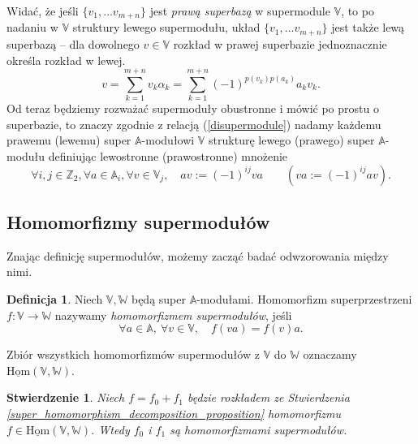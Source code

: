 \documentclass[11pt,a4paper]{report}
\newtheorem{proposition}[theorem]{Stwierdzenie}
\theoremstyle{definition}
\newtheorem{definition}[theorem]{Definicja}
\begin{document}
Widać, że jeśli $\{ v_1, \ldots v_{m+n} \}$ jest \textit{prawą superbazą} w supermodule $\mathbb{V}$, to po nadaniu w $\mathbb{V}$ struktury lewego supermodułu, układ $\{ v_1, \ldots v_{m+n} \}$ jest także lewą superbazą -- dla dowolnego $v\in \mathbb{V}$ rozkład w prawej superbazie jednoznacznie określa rozkład w lewej.
\begin{equation*}
v = \sum_{k=1}^{m+n} v_k \alpha_k = \sum_{k=1}^{m+n} (-1)^{p(v_k)p(a_k)} a_k v_k.
\end{equation*}
Od teraz będziemy rozważać supermoduły obustronne i mówić po prostu o superbazie, to znaczy zgodnie z relacją (\ref{disupermodule}) nadamy każdemu prawemu (lewemu) super $\mathbb{A}$-modułowi $\mathbb{V}$ strukturę lewego (prawego) super $\mathbb{A}$-modułu definiując lewostronne (prawostronne) mnożenie
\begin{equation*}
 \forall i,j \in \mathbb{Z}_2, \forall a \in \mathbb{A}_i, \forall v \in \mathbb{V}_j, \quad av := (-1)^{ij}va \qquad \left( va := (-1)^{ij}av \right).
\end{equation*}

\subsection{Homomorfizmy supermodułów}

Znając definicję supermodułów, możemy zacząć badać odwzorowania między nimi.

\begin{definition}
\label{superlinear_morphism}
Niech $\mathbb{V}, \mathbb{W}$ będą super $\mathbb{A}$-modułami. Homomorfizm superprzestrzeni $f: \mathbb{V} \rightarrow \mathbb{W}$ nazywamy \textit{homomorfizmem supermodułów}, jeśli 
\begin{equation}
\label{superlinear_morphism_property}
\forall a \in \mathbb{A},\ \forall v \in \mathbb{V}, \quad f(va) = f(v)a.
\end{equation}
\end{definition}

Zbiór wszystkich homomorfizmów supermodułów z $\mathbb{V}$ do $\mathbb{W}$  oznaczamy $\underline{\mathrm{Hom}}(\mathbb{V},\mathbb{W})$.

\begin{proposition}
Niech $f = f_0 + f_1$ będzie rozkładem ze Stwierdzenia \ref{super_homomorphism_decomposition_proposition} homomorfizmu $f \in \underline{\mathrm{Hom}}(\mathbb{V},\mathbb{W})$. Wtedy $f_0$ i $f_1$ są homomorfizmami supermodułów.
\end{proposition}
\end{document}
